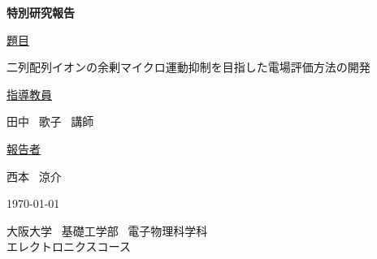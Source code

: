 \begin{titlepage}
	\begin{center}
		\vspace{15truemm}
		{\huge \bf{特別研究報告}\par}
		\vspace{10truemm}
		{\huge \underline{題目}\par}
		\vspace{5truemm}
		{\huge 二列配列イオンの余剰マイクロ運動抑制を目指した電場評価方法の開発\par}
		\vspace{15truemm}
		{\huge \underline{指導教員}\par}
		\vspace{5truemm}
		{\huge 田中 \ 歌子 \ 講師\par}
		\vspace{15truemm}
		{\huge \underline{報告者}\par}
		\vspace{5truemm}
		{\huge 西本 \ 涼介\par}
		\vspace{15truemm}
		{\huge \today\par}
		\vspace{15truemm}
		{\huge 大阪大学 \ 基礎工学部 \ 電子物理科学科 \\ エレクトロニクスコース}
	\end{center}
\end{titlepage}
